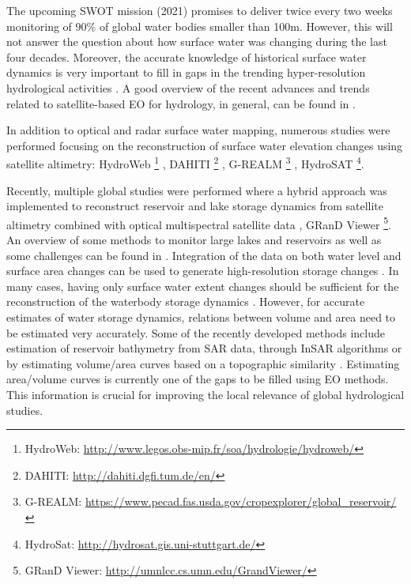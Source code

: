 The upcoming SWOT mission (2021) promises to deliver twice every two weeks monitoring of 90\% of global water bodies smaller than 100m. However, this will not answer the question about how surface water was changing during the last four decades. Moreover, the accurate knowledge of historical surface water dynamics is very important to fill in gaps in the trending hyper-resolution hydrological activities \citep{bierkens2015hyper}. A good overview of the recent advances and trends related to satellite-based EO for hydrology, in general, can be found in \citep{mccabe2017future}.

In addition to optical and radar surface water mapping, numerous studies were performed focusing on the reconstruction of surface water elevation changes using satellite altimetry: HydroWeb \footnote{HydroWeb: \url{http://www.legos.obs-mip.fr/soa/hydrologie/hydroweb/}} \citep{cretaux2005satellite}, DAHITI \footnote{DAHITI: \url{http://dahiti.dgfi.tum.de/en/}} \citep{schwatke2015dahiti}, G-REALM \footnote{G-REALM: \url{https://www.pecad.fas.usda.gov/cropexplorer/global_reservoir/}} \citep{birkett2011research}, HydroSAT \footnote{HydroSat: \url{http://hydrosat.gis.uni-stuttgart.de/}}. 

Recently, multiple global studies were performed where a hybrid approach was implemented to reconstruct reservoir and lake storage dynamics from satellite altimetry combined with optical multispectral satellite data \citep{khandelwal2016approach}, GRanD Viewer \footnote{GRanD Viewer: \url{http://umnlcc.cs.umn.edu/GrandViewer/}}. An overview of some methods to monitor large lakes and reservoirs as well as some challenges can be found in \citep{karpatne2016global}. Integration of the data on both water level and surface area changes can be used to generate high-resolution storage changes \cite{duan2013estimating}. In many cases, having only surface water extent changes should be sufficient for the reconstruction of the waterbody storage dynamics \citep{liebe2005estimation}. However, for accurate estimates of water storage dynamics, relations between volume and area need to be estimated very accurately.  Some of the recently developed methods include estimation of reservoir bathymetry from SAR data, through InSAR algorithms \citep{amitrano2014sentinel} or by estimating volume/area curves based on a topographic similarity \citep{bemmelen2016determining}. Estimating area/volume curves is currently one of the gaps to be filled using EO methods. This information is crucial for improving the local relevance of global hydrological studies. 

